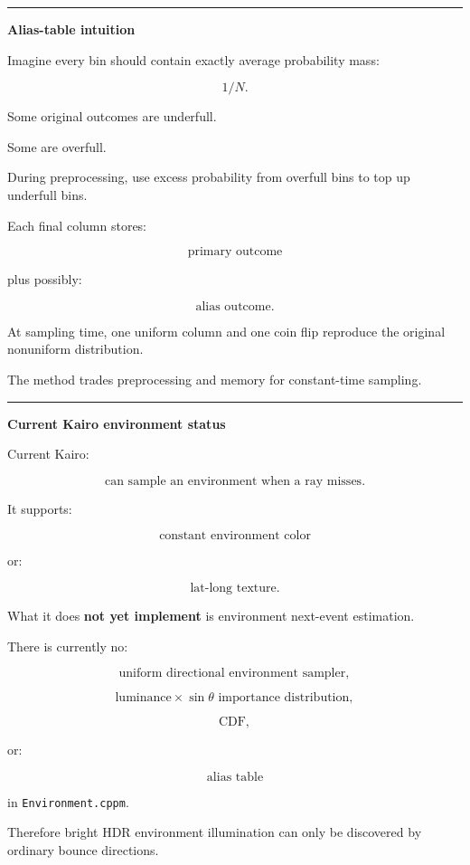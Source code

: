 \begin{center}\rule{0.5\linewidth}{0.5pt}\end{center}

\textbf{Alias-table intuition}

Imagine every bin should contain exactly average probability mass:

\[
1/N.
\]

Some original outcomes are underfull.

Some are overfull.

During preprocessing, use excess probability from overfull bins to top up underfull bins.

Each final column stores:

\[
\text{primary outcome}
\]

plus possibly:

\[
\text{alias outcome}.
\]

At sampling time, one uniform column and one coin flip reproduce the original nonuniform distribution.

The method trades preprocessing and memory for constant-time sampling.

\begin{center}\rule{0.5\linewidth}{0.5pt}\end{center}

\textbf{Current Kairo environment status}

Current Kairo:

\[
\text{can sample an environment when a ray misses}.
\]

It supports:

\[
\text{constant environment color}
\]

or:

\[
\text{lat-long texture}.
\]

What it does \textbf{not yet implement} is environment next-event estimation.

There is currently no:

\[
\text{uniform directional environment sampler},
\]

\[
\text{luminance}\times\sin\theta\text{ importance distribution},
\]

\[
\text{CDF},
\]

or:

\[
\text{alias table}
\]

in \texttt{Environment.cppm}.

Therefore bright HDR environment illumination can only be discovered by ordinary bounce directions.

